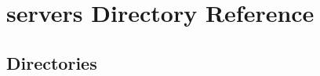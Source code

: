\section{servers Directory Reference}
\label{dir_b4b28185343f1bd39ef36cc61036dc66}
\subsection*{Directories}
\begin{DoxyCompactItemize}
\end{DoxyCompactItemize}
